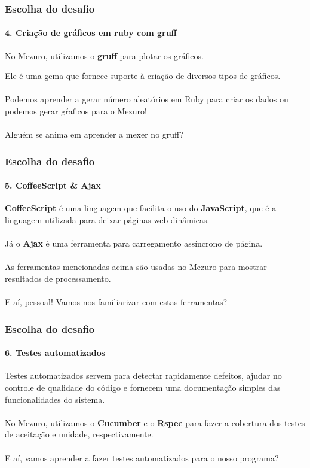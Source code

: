 \documentclass{beamer}
\begin{document}
\begin{frame}
	\frametitle{Escolha do desafio}
  \framesubtitle{4. Criação de gráficos em ruby com gruff}
  
  No Mezuro, utilizamos o \textbf{gruff} para plotar os gráficos.
  
  Ele é uma gema que fornece suporte à criação de diversos tipos de gráficos. \\~\\
  Podemos aprender a gerar número aleatórios em Ruby para criar os dados ou podemos gerar gŕaficos para o Mezuro! \\~\\
  
  Alguém se anima em aprender a mexer no gruff?
\end{frame}

\begin{frame}
	\frametitle{Escolha do desafio}
  \framesubtitle{5. CoffeeScript \& Ajax}
  
  \textbf{CoffeeScript} é uma linguagem que facilita o uso do \textbf{JavaScript}, que é a linguagem utilizada para deixar páginas web dinâmicas. \\~\\
  Já o \textbf{Ajax} é uma ferramenta para carregamento assíncrono de página. \\~\\
  As ferramentas mencionadas acima são usadas no Mezuro para mostrar resultados de processamento. \\~\\
  
  E aí, pessoal! Vamos nos familiarizar com estas ferramentas?
\end{frame}

\begin{frame}
	\frametitle{Escolha do desafio}
  \framesubtitle{6. Testes automatizados}
  
  Testes automatizados servem para detectar  rapidamente  defeitos,  ajudar  no  controle de  qualidade  do  código  e  fornecem   uma  documentação  simples  das  funcionalidades  do sistema. \\~\\
  No Mezuro, utilizamos o \textbf{Cucumber} e o \textbf{Rspec} para fazer a cobertura dos testes de aceitação e unidade, respectivamente. \\~\\
  
  E aí, vamos aprender a fazer testes automatizados para o nosso programa?
 

\end{frame}
\end{document}
